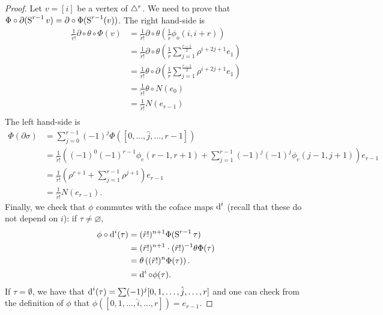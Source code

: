 \begin{proof}                                                                          
	Let $v = [i]$ be a vertex of $\triangle^{r}$. We need to prove that $\Phi\circ \partial(\operatorname{S}^{r-1}v) = \partial\circ \Phi(\operatorname{S}^{r-1}(v))$. The right hand-side is 
	\begin{align*}
		\frac{1}{\tilde{r}!} \partial\circ \theta \circ \Phi(v) &= 
		\frac{1}{\tilde{r}!} \partial\circ \theta \left(\frac{1}{\tilde{r}}\phi_o(i,i+r)\right) \\
		&= \frac{1}{\tilde{r}!} \partial\circ \theta \left(\frac{1}{\tilde{r}}\sum_{j=1}^{\frac{r-1}{2}}\rho^{i+2j+1} e_{1}\right) \\
		&= \frac{1}{\tilde{r}!} \theta\circ\partial \left(\frac{1}{\tilde{r}}\sum_{j=1}^{\frac{r-1}{2}}\rho^{i+2j+1} e_{1}\right) \\
		&= \frac{1}{\tilde{r}!} \theta\circ N(e_0) \\
		&= \frac{1}{\tilde{r}!} N(e_{r-1}) \\
		\end{align*}
	The left hand-side is
	\begin{align*}
		\Phi(\partial\sigma) &= \sum_{j=0}^{r-1} (-1)^j\Phi([0,\ldots,\hat{j},\ldots,r-1]) \\
		&= \frac{1}{\tilde{r}!}\left((-1)^0(-1)^{r-1}\phi_e(r-1,r+1)+\sum_{j=1}^{r-1} (-1)^j(-1)^{j}\phi_e(j-1,j+1)\right)e_{r-1} \\
		&= \frac{1}{\tilde{r}!}\left (\rho^{r+1}+\sum_{j=1}^{r-1} \rho^{j+1}\right) e_{r-1} \\
		&= \frac{1}{\tilde{r}!}N(e_{r-1}).
	\end{align*}
	Finally, we check that $\phi$ commutes with the coface maps $\operatorname{d}^i$ (recall that these do not depend on $i$): if $\tau\neq \varnothing$,
	 \begin{align*}
	\phi\circ \operatorname{d}^i(\tau) &= (\tilde{r}!)^{n+1}\Phi(\operatorname{S}^{r-1}\tau) \\
	&= (\tilde{r}!)^{n+1}\cdot (\tilde{r}!)^{-1}\theta\Phi(\tau)\\
	&= \theta\left((\tilde{r}!)^{n}\Phi(\tau)\right).\\
	&= \operatorname{d}^i\circ \phi(\tau).
	\end{align*}
	If $\tau=\emptyset$, we have that $\operatorname{d}^i(\tau) = \sum(-1)^j [0,1,\dots,\hat{j},\ldots,r]$ and one can check from the definition of $\phi$ that $\phi([0,1,\dots,\hat{i},\ldots,r]) = e_{r-1}$.
\end{proof}

